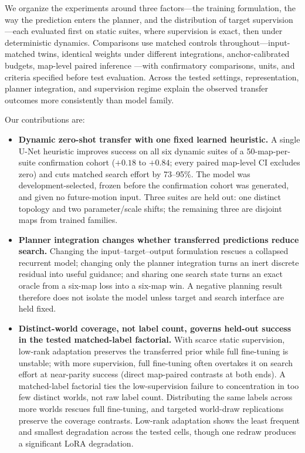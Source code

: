 \documentclass[letterpaper]{article} %
\begin{document}
We organize the experiments around three factors---the training formulation, the way the prediction enters the planner, and the distribution of target supervision---each evaluated first on static suites, where supervision is exact, then under deterministic dynamics. Comparisons use matched controls throughout---input-matched twins, identical weights under different integrations, anchor-calibrated budgets, map-level paired inference \citep{henderson2018matters,agarwal2021precipice,pineau2021reproducibility}---with confirmatory comparisons, units, and criteria specified before test evaluation. Across the tested settings, representation, planner integration, and supervision regime explain the observed transfer outcomes more consistently than model family.

Our contributions are:
\begin{itemize}
    \item \textbf{Dynamic zero-shot transfer with one fixed learned heuristic.} A single U-Net heuristic improves success on all six dynamic suites of a 50-map-per-suite confirmation cohort ($+0.18$ to $+0.84$; every paired map-level CI excludes zero) and cuts matched search effort by 73--95\%. The model was development-selected, frozen before the confirmation cohort was generated, and given no future-motion input. Three suites are held out: one distinct topology and two parameter/scale shifts; the remaining three are disjoint maps from trained families.
    \item \textbf{Planner integration changes whether transferred predictions reduce search.} Changing the input--target--output formulation rescues a collapsed recurrent model; changing only the planner integration turns an inert discrete residual into useful guidance; and sharing one search state turns an exact oracle from a six-map loss into a six-map win. A negative planning result therefore does not isolate the model unless target and search interface are held fixed.
    \item \textbf{Distinct-world coverage, not label count, governs held-out success in the tested matched-label factorial.} With scarce static supervision, low-rank adaptation preserves the transferred prior while full fine-tuning is unstable; with more supervision, full fine-tuning often overtakes it on search effort at near-parity success (direct map-paired contrasts at both ends). A matched-label factorial ties the low-supervision failure to concentration in too few distinct worlds, not raw label count. Distributing the same labels across more worlds rescues full fine-tuning, and targeted world-draw replications preserve the coverage contrasts. Low-rank adaptation shows the least frequent and smallest degradation across the tested cells, though one redraw produces a significant LoRA degradation.
\end{itemize}
\end{document}

